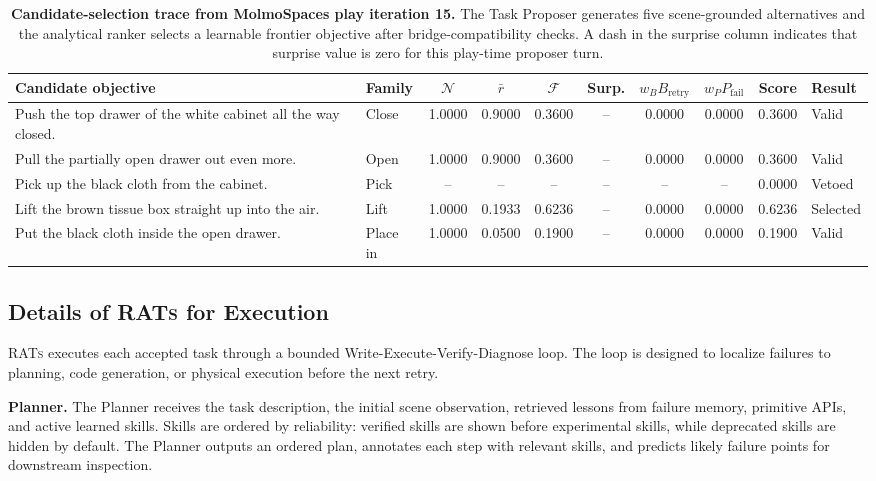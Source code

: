 \begin{table}[t]
\centering
\scriptsize
\setlength{\tabcolsep}{4pt}
\caption{
\textbf{Candidate-selection trace from MolmoSpaces play iteration 15.}
The Task Proposer generates five scene-grounded alternatives and the analytical
ranker selects a learnable frontier objective after bridge-compatibility
checks. A dash in the surprise column indicates that surprise
value is zero for this play-time proposer turn.
}
\label{tab:proposal_selection_example}
\vspace{1.5em}
\begin{tabular}{p{} l c c c c c c c p{}}
\toprule
\textbf{Candidate objective} & \textbf{Family} & $\mathcal{N}$ & $\bar{r}$ &
$\mathcal{F}$ & \textbf{Surp.} & $w_BB_{\mathrm{retry}}$ &
$w_PP_{\mathrm{fail}}$ & \textbf{Score} & \textbf{Result} \\
\midrule
Push the top drawer of the white cabinet all the way closed. & Close & 1.0000 & 0.9000 & 0.3600 & -- & 0.0000 & 0.0000 & 0.3600 & Valid \\
Pull the partially open drawer out even more. & Open & 1.0000 & 0.9000 & 0.3600 & -- & 0.0000 & 0.0000 & 0.3600 & Valid \\
Pick up the black cloth from the cabinet. & Pick & -- & -- & -- & -- & -- & -- & 0.0000 & Vetoed \\
Lift the brown tissue box straight up into the air. & Lift & 1.0000 & 0.1933 & 0.6236 & -- & 0.0000 & 0.0000 & 0.6236 & Selected \\
Put the black cloth inside the open drawer. & Place in & 1.0000 & 0.0500 & 0.1900 & -- & 0.0000 & 0.0000 & 0.1900 & Valid \\
\bottomrule
\end{tabular}
\end{table}

\subsection{Details of \textsc{RATs} for Execution}
\label{sec:appendix_execution}

\textsc{RATs} executes each accepted task through a bounded
Write-Execute-Verify-Diagnose loop. The loop is designed to localize failures
to planning, code generation, or physical execution before the next retry.

\textbf{Planner.}
The Planner receives the task description, the initial scene observation,
retrieved lessons from failure memory, primitive APIs, and active learned
skills. Skills are ordered by reliability: verified skills are shown before
experimental skills, while deprecated skills are hidden by default. The Planner
outputs an ordered plan, annotates each step with relevant skills, and predicts
likely failure points for downstream inspection.

